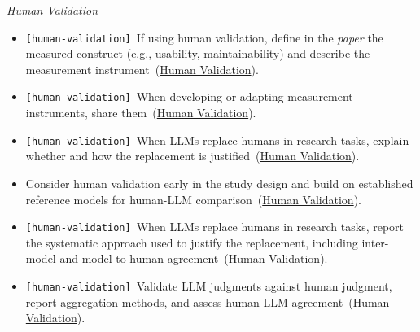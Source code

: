 \documentclass[smallextended]{svjour3}
\makeatletter
\newcommand{\must}{\textbf{must}\xspace}
\newcommand{\should}{\textbf{should}\xspace}
\newcommand{\paper}{\emph{paper}\xspace}
\newcommand{\paper}{\emph{paper}\xspace}
\newcommand{\iconM}{\usebox{\iconMbox}\xspace}
\newcommand{\iconS}{\usebox{\iconSbox}\xspace}
\newcommand{\iconM}{●\xspace}
\newcommand{\iconS}{○\xspace}
\newcommand{\condition}[1]{\texttt{\small[#1]}\,}
\newcommand{\condition}[1]{@@cond:#1@@}
\newcommand{\annotators}{\hyperref[sec:llms-as-annotators]{\mbox{\emph{LLMs as Annotators}}}\xspace}
\newcommand{\judges}{\hyperref[sec:llms-as-judges]{\mbox{\emph{LLMs as Judges}}}\xspace}
\newcommand{\synthesis}{\hyperref[sec:llms-for-synthesis]{\mbox{\emph{LLMs for Synthesis}}}\xspace}
\newcommand{\subjects}{\hyperref[sec:llms-as-subjects]{\mbox{\emph{LLMs as Subjects}}}\xspace}
\newcommand{\annotators}{\href{/study-types/annotators/}{\emph{LLMs as Annotators}}\xspace}
\newcommand{\judges}{\href{/study-types/judges/}{\emph{LLMs as Judges}}\xspace}
\newcommand{\synthesis}{\href{/study-types/synthesis/}{\emph{LLMs for Synthesis}}\xspace}
\newcommand{\subjects}{\href{/study-types/subjects/}{\emph{LLMs as Subjects}}\xspace}
\newcommand{\refhumanvalidation}{\hyperref[sec:use-human-validation-for-llm-outputs]{Human Validation}}
\newcommand{\refhumanvalidation}{\href{/guidelines/human-validation/}{Human Validation}}
\makeatother
\begin{document}
\begin{appendices}
\noindent\textit{Human Validation}
\begin{itemize}[label={},leftmargin=*]
    \item \iconM \condition{human-validation} If using human validation, define in the \paper the measured construct (e.g., usability, maintainability) and describe the measurement instrument~(\refhumanvalidation).
    \item \iconM \condition{human-validation} When developing or adapting measurement instruments, share them~(\refhumanvalidation).
    \item \iconM \condition{human-validation} When LLMs replace humans in research tasks, explain whether and how the replacement is justified~(\refhumanvalidation).
    \item \iconS Consider human validation early in the study design and build on established reference models for human-LLM comparison~(\refhumanvalidation).
    \item \iconS \condition{human-validation} When LLMs replace humans in research tasks, report the systematic approach used to justify the replacement, including inter-model and model-to-human agreement~(\refhumanvalidation).
    \item \iconS \condition{human-validation} Validate LLM judgments against human judgment, report aggregation methods, and assess human-LLM agreement~(\refhumanvalidation).

\end{itemize}
\end{appendices}
\end{document}
